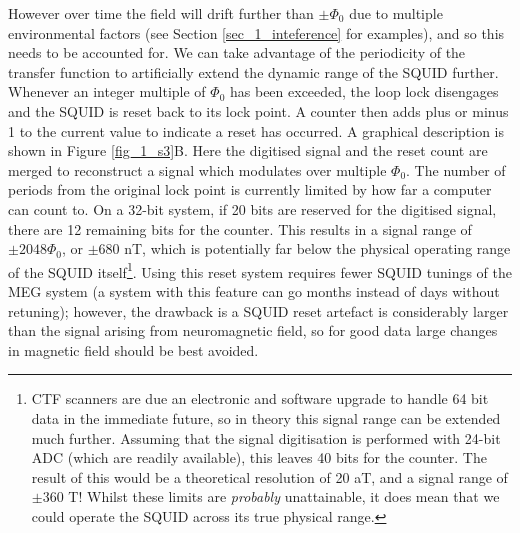 However over time the field will drift further than $\pm\Phi_0$ due to multiple environmental factors (see Section \ref{sec_1_inteference} for examples), and so this needs to be accounted for. We can take advantage of the periodicity of the transfer function to artificially extend the dynamic range of the SQUID further. Whenever an integer multiple of $\Phi_0$ has been exceeded, the loop lock disengages and the SQUID is reset back to its lock point. A counter then adds plus or minus 1 to the current value to indicate a reset has occurred. A graphical description is shown in Figure \ref{fig_1_s3}B. Here the digitised signal and the reset count are merged to reconstruct a signal which modulates over multiple $\Phi_0$. The number of periods from the original lock point is currently limited by how far a computer can count to. On a 32-bit system, if 20 bits are reserved for the digitised signal, there are 12 remaining bits for the counter. This results in a signal range of $\pm 2048 \Phi_0$, or $\pm680$ nT, which is potentially far below the physical operating range of the SQUID itself\footnote{CTF scanners are due an electronic and software upgrade to handle 64 bit data in the immediate future, so in theory this signal range can be extended much further. Assuming that the signal digitisation is performed with 24-bit ADC (which are readily available), this leaves 40 bits for the counter. The result of this would be a theoretical resolution of 20 aT, and a signal range of $\pm 360$ T! Whilst these limits are \textit{probably} unattainable, it does mean that we could operate the SQUID across its true physical range.}. Using this reset system requires fewer SQUID tunings of the MEG system (a system with this feature can go months instead of days without retuning); however, the drawback is a SQUID reset artefact is considerably larger than the signal arising from neuromagnetic field, so for good data large changes in magnetic field should be best avoided.    

